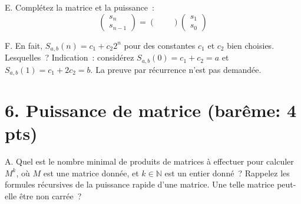 \documentclass[11pt]{article}
\def\N{\mathbb N}
\begin{document}
   
\medskip
E. Complétez la matrice et la puissance~:
$$
\left( \begin{array}{c}
s_n \\
s_{n-1} \end{array} \right) = \left( \begin{array}{cc}
~ & ~ \\
~ & ~ \end{array} \right) \left( \begin{array}{c}
s_1 \\
s_0 \end{array} \right)
$$

F. En fait, $S_{a,b}(n) = c_1 + c_2 2^n$ pour des constantes $c_1$ et $c_2$ bien choisies. Lesquelles~? Indication~: considérez $S_{a,b}(0)=c_1 + c_2=a$ et
$S_{a,b}(1)=c_1 + 2 c_2=b$. La preuve par récurrence n'est pas demandée.

\section*{6. Puissance de matrice (barême: 4 pts)}

A. Quel est le nombre minimal de produits de matrices à effectuer pour calculer $M^k$, où $M$ est une matrice donnée, et $k\in \N$ est un entier donné~?
Rappelez les formules récursives de la puissance rapide d'une matrice. Une telle matrice peut-elle être non carrée~?
\end{document}
